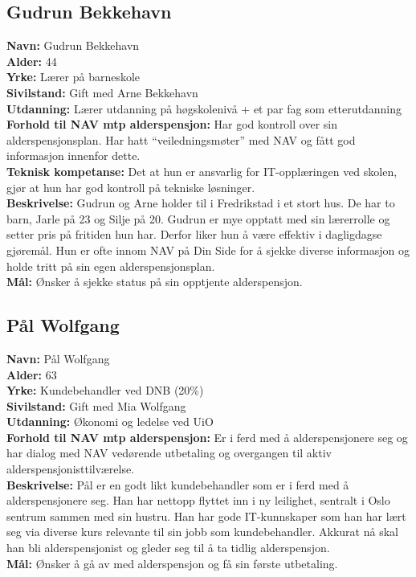\documentclass[informationsecurity]{gucmasterproject}
\begin{document}
\subsection{Gudrun Bekkehavn}
\textbf{Navn:} Gudrun Bekkehavn \\
\textbf{Alder:} 44 \\
\textbf{Yrke:} Lærer på barneskole \\
\textbf{Sivilstand:} Gift med Arne Bekkehavn \\
\textbf{Utdanning:} Lærer utdanning på høgskolenivå + et par fag som etterutdanning \\
\textbf{Forhold til NAV mtp alderspensjon:} Har god kontroll over sin alderspensjonsplan. Har hatt “veiledningsmøter” med NAV og fått god informasjon innenfor dette.  \\
\textbf{Teknisk kompetanse:} Det at hun er ansvarlig for IT-opplæringen ved skolen, gjør at hun har god kontroll på tekniske løsninger.  \\
\textbf{Beskrivelse:} Gudrun og Arne holder til i Fredrikstad i et stort hus. De har to barn, Jarle på 23 og Silje på 20. Gudrun er mye opptatt med sin lærerrolle og setter pris på fritiden hun har. Derfor liker hun å være effektiv i dagligdagse gjøremål.  Hun er ofte innom NAV på Din Side for å sjekke diverse informasjon og holde tritt på sin egen alderspensjonsplan.  \\
\textbf{Mål:} Ønsker å sjekke status på sin opptjente alderspensjon. 


\subsection{Pål Wolfgang}
\textbf{Navn:} Pål Wolfgang \\
\textbf{Alder:} 63 \\
\textbf{Yrke:} Kundebehandler ved DNB (20\%) \\
\textbf{Sivilstand:} Gift med Mia Wolfgang \\
\textbf{Utdanning:} Økonomi og ledelse ved UiO \\
\textbf{Forhold til NAV mtp alderspensjon:} Er i ferd med å alderspensjonere seg og har dialog med NAV vedørende utbetaling og overgangen til aktiv alderspensjonisttilværelse. \\
\textbf{Beskrivelse:} Pål er en godt likt kundebehandler som er i ferd med å alderspensjonere seg. Han har nettopp flyttet inn i ny leilighet, sentralt i Oslo sentrum sammen med sin hustru. Han har gode IT-kunnskaper som han har lært seg via diverse kurs relevante til sin jobb som kundebehandler. Akkurat nå skal han bli alderspensjonist og gleder seg til å ta tidlig alderspensjon.  \\
\textbf{Mål:} Ønsker å gå av med alderspensjon og få sin første utbetaling.
\end{document}
